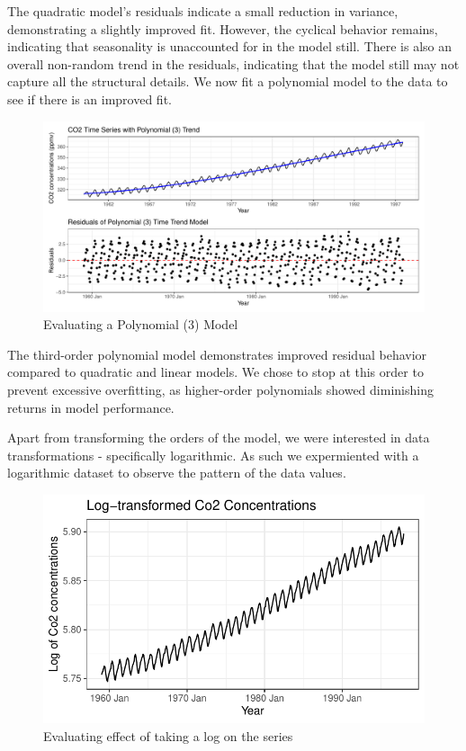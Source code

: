 \documentclass[
]{article}
\begin{document}
\newpage

The quadratic model's residuals indicate a small reduction in variance, demonstrating a slightly improved fit. However, the cyclical behavior remains, indicating that seasonality is unaccounted for in the model still. There is also an overall non-random trend in the residuals, indicating that the model still may not capture all the structural details. We now fit a polynomial model to the data to see if there is an improved fit.

\begin{figure}

{\centering \includegraphics[width=1\linewidth]{lab_prompt_Updated_files/figure-latex/polynomial-model-plots-1} 

}

\caption{Evaluating a Polynomial (3) Model}\label{fig:polynomial-model-plots}
\end{figure}

The third-order polynomial model demonstrates improved residual behavior compared to quadratic and linear models. We chose to stop at this order to prevent excessive overfitting, as higher-order polynomials showed diminishing returns in model performance.

Apart from transforming the orders of the model, we were interested in data transformations - specifically logarithmic. As such we expermiented with a logarithmic dataset to observe the pattern of the data values.

\begin{figure}

{\centering \includegraphics[width=0.8\linewidth]{lab_prompt_Updated_files/figure-latex/log-transformed-plot-1} 

}

\caption{Evaluating effect of taking a log on the series}\label{fig:log-transformed-plot}
\end{figure}
\end{document}
